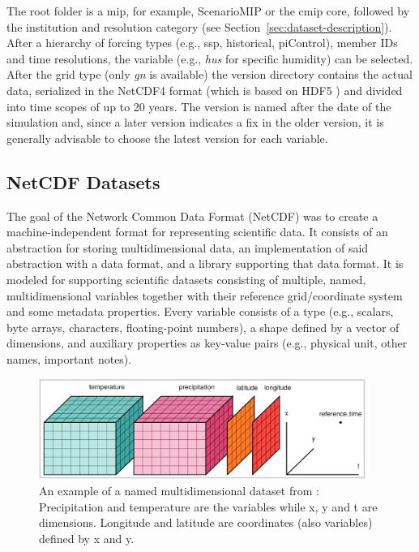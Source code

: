 The root folder is a \ac{mip}, for example, ScenarioMIP or the \ac{cmip} core, followed by the institution and resolution category (see Section~\ref{sec:dataset-description}). 
After a hierarchy of forcing types (e.g., \ac{ssp}, historical, piControl), member IDs and time resolutions, the variable (e.g., \textit{hus} for specific humidity) can be selected. 
After the grid type (only \textit{gn} is available) the version directory contains the actual data, serialized in the NetCDF4 format (which is based on HDF5 \cite{folk_overview_2011}) and divided into time scopes of up to 20 years. 
The version is named after the date of the simulation and, since a later version indicates a fix in the older version, it is generally advisable to choose the latest version for each variable.


\subsection{NetCDF Datasets}

The goal of the Network Common Data Format (NetCDF) was to create a machine-independent format for representing scientific data. 
It consists of an abstraction for storing multidimensional data, an implementation of said abstraction with a data format, and a library supporting that data format. 
It is modeled for supporting scientific datasets consisting of multiple, named, multidimensional variables together with their reference grid/coordinate system and some metadata properties.
Every variable consists of a type (e.g., scalars, byte arrays, characters, floating-point numbers), a shape defined by a vector of dimensions, and auxiliary properties as key-value pairs (e.g., physical unit, other names, important notes). \cite{rew_netcdf_1990}

\begin{figure}[htb]
  \begin{center}
    \includegraphics[width=0.95\textwidth]{figures/netcdf_visual_example.png}
  \end{center}
  \caption[Multidimensional Dataset Illustration]{An example of a named multidimensional dataset from \cite{hoyer_xarray_2017}: Precipitation and temperature are the variables while x, y and t are dimensions. Longitude and latitude are coordinates (also variables) defined by x and y.}
  \label{fig:example_dataset_structure}
\end{figure}

